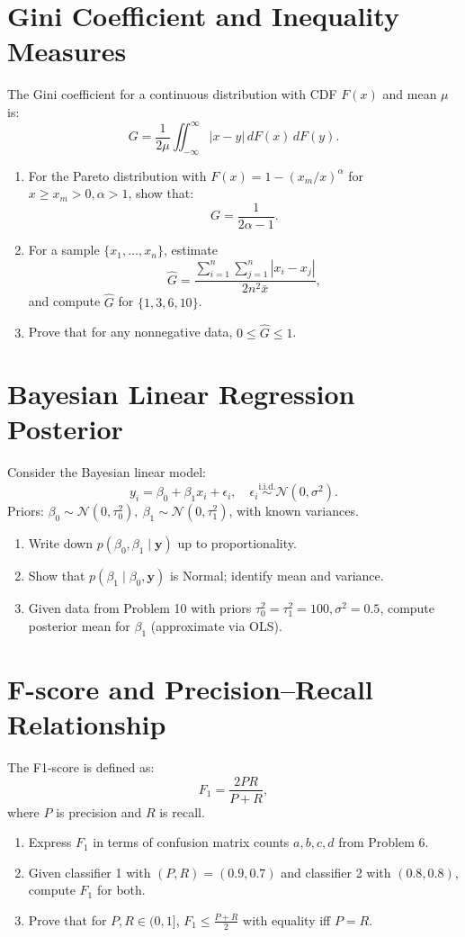 \documentclass[12pt,a4paper]{article}
\begin{document}
\section{Gini Coefficient and Inequality Measures}
The Gini coefficient for a continuous distribution with CDF \( F(x) \) and mean \( \mu \) is:
\[
G = \frac{1}{2\mu}\iint_{-\infty}^{\infty} |x - y|\, dF(x)\,dF(y).
\]
\begin{enumerate}[label=(\arabic*)]
\item For the Pareto distribution with \( F(x) = 1 - (x_m/x)^\alpha \) for \( x \ge x_m > 0, \alpha > 1 \), show that:
\[
G = \frac{1}{2\alpha - 1}.
\]
\item For a sample \( \{x_1,\ldots,x_n\} \), estimate
\[
\hat{G} = \frac{\sum_{i=1}^n\sum_{j=1}^n |x_i - x_j|}{2n^2\bar{x}},
\]
and compute \( \hat{G} \) for \( \{1,3,6,10\} \).
\item Prove that for any nonnegative data, \( 0 \le \hat{G} \le 1 \).
\end{enumerate}

\section{Bayesian Linear Regression Posterior}
Consider the Bayesian linear model:
\[
y_i = \beta_0 + \beta_1 x_i + \epsilon_i, \quad \epsilon_i \stackrel{\text{i.i.d.}}{\sim} \mathcal{N}(0,\sigma^2).
\]
Priors: \( \beta_0 \sim \mathcal{N}(0,\tau_0^2), \ \beta_1 \sim \mathcal{N}(0,\tau_1^2) \), with known variances.
\begin{enumerate}[label=(\arabic*)]
\item Write down \( p(\beta_0,\beta_1\mid \mathbf{y}) \) up to proportionality.
\item Show that \( p(\beta_1\mid\beta_0,\mathbf{y}) \) is Normal; identify mean and variance.
\item Given data from Problem 10 with priors \( \tau_0^2=\tau_1^2=100, \sigma^2=0.5 \), compute posterior mean for \( \beta_1 \) (approximate via OLS).
\end{enumerate}

\section{F-score and Precision–Recall Relationship}
The F1-score is defined as:
\[
F_1 = \frac{2PR}{P + R},
\]
where \( P \) is precision and \( R \) is recall.
\begin{enumerate}[label=(\arabic*)]
\item Express \( F_1 \) in terms of confusion matrix counts \( a,b,c,d \) from Problem 6.
\item Given classifier 1 with \( (P,R)=(0.9,0.7) \) and classifier 2 with \( (0.8,0.8) \), compute \( F_1 \) for both.
\item Prove that for \( P,R\in(0,1] \), \( F_1 \le \tfrac{P+R}{2} \) with equality iff \( P=R \).
\end{enumerate}
\end{document}
